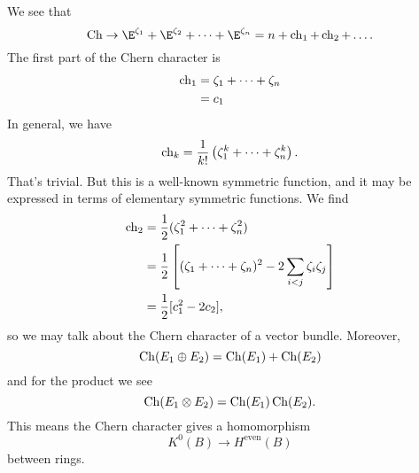 We see that
\begin{equation}
\chernChar\to \E^{\zeta_{1}}+\E^{\zeta_{2}}+\dots+\E^{\zeta_{n}} =
n + \chernPt_{1}+\chernPt_{2}+\dots.
\end{equation}
The first part of the Chern character is
\begin{equation}
\begin{split}
\mathop{\mathrm{ch}}\nolimits_{1} &= \zeta_1+\dots+\zeta_{n} \\
&=c_{1}
\end{split}
\end{equation}
In general, we have
\begin{equation}
\mathop{\mathrm{ch}}\nolimits_{k} =
\frac{1}{k!}\left(\zeta_{1}^{k}+\dots+\zeta_{n}^{k}\right).
\end{equation}
That's trivial. But this is a well-known symmetric function, and
it may be expressed in terms of elementary symmetric
functions. We find
\begin{equation}
\begin{split}
\mathop{\mathrm{ch}}\nolimits_{2} &= \frac{1}{2}(\zeta_{1}^{2}+\dots+\zeta_{n}^{2})\\
&= \frac{1}{2}\left[(\zeta_{1}+\dots+\zeta_{n})^{2}-2\sum_{i<j}\zeta_{i}\zeta_{j}\right]\\
&= \frac{1}{2}[c_{1}^{2}-2c_{2}],
\end{split}
\end{equation}
so we may talk about the Chern character of a vector
bundle. Moreover,
\begin{equation}
\mathop{\mathrm{Ch}}\nolimits(E_{1}\oplus E_{2}) =
\mathop{\mathrm{Ch}}\nolimits(E_{1})+\mathop{\mathrm{Ch}}\nolimits(E_{2})
\end{equation}
and for the product we see
\begin{equation}
\mathop{\mathrm{Ch}}\nolimits(E_{1}\otimes E_{2}) =
\mathop{\mathrm{Ch}}\nolimits(E_{1})\mathop{\mathrm{Ch}}\nolimits(E_{2}).
\end{equation}
This means the Chern character gives a homomorphism 
\begin{equation}
K^{0}(B)\to H^{\text{even}}(B)
\end{equation}
between rings.

